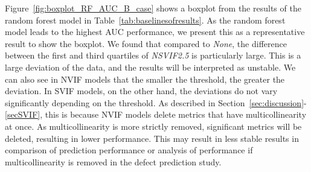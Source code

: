 Figure~\ref{fig:boxplot_RF_AUC_B_case} shows a boxplot from the results of the random forest model in Table~\ref{tab:baselinesofresults}. As the random forest model leads to the highest AUC performance, we present this as a representative result to show the boxplot. 
We found that compared to \emph{None}, the difference between the first and third quartiles of \emph{NSVIF2.5} is particularly large. This is a large deviation of the data, and the results will be interpreted as unstable. 
We can also see in NVIF models that the smaller the threshold, the greater the deviation. In SVIF models, on the other hand, the deviations do not vary significantly depending on the threshold.
As described in Section~\ref{sec:discussion}-\ref{secSVIF}, this is because NVIF models delete metrics that have multicollinearity at once. As multicollinearity is more strictly removed, significant metrics will be deleted, resulting in lower performance. This may result in less stable results in comparison of prediction performance or analysis of performance if multicollinearity is removed in the defect prediction study.



